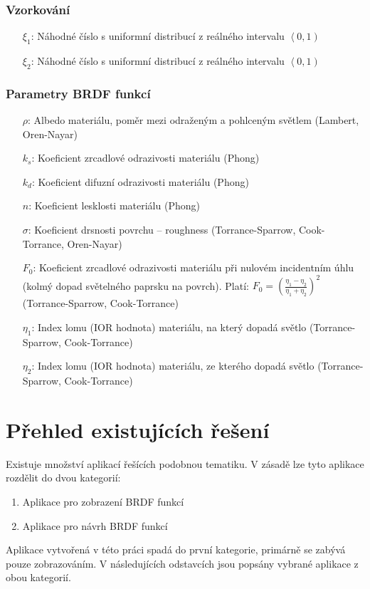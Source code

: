 \documentclass[czech,master]{diploma}
\newcommand{\intervalco}[2]{\left<{{#1},{#2}}\right)}
\newcommand{\randU}{\xi_{1}}
\newcommand{\randV}{\xi_{2}}
\newcommand{\alb}{\rho}
\newcommand{\rough}{\sigma}
\newcommand{\Fzero}{F_0}
\begin{document}
\subsection{Vzorkování}

\begin{itemize}
  \item[\(\randU\):] Náhodné číslo s uniformní distribucí z reálného intervalu \(\intervalco{0}{1}\)
  \item[\(\randV\):] Náhodné číslo s uniformní distribucí z reálného intervalu \(\intervalco{0}{1}\)
\end{itemize}

\subsection{Parametry BRDF funkcí}

\begin{itemize}
  \item[\(\alb\):] Albedo materiálu, poměr mezi odraženým a pohlceným světlem (Lambert, Oren-Nayar)
  \item[\(k_s\):] Koeficient zrcadlové odrazivosti materiálu (Phong)
  \item[\(k_d\):] Koeficient difuzní odrazivosti materiálu (Phong)
  \item[\(n\):] Koeficient lesklosti materiálu (Phong)
  \item[\(\rough\):] Koeficient drsnosti povrchu -- roughness (Torrance-Sparrow, Cook-Torrance, Oren-Nayar)
  \item[\(\Fzero\):] Koeficient zrcadlové odrazivosti materiálu při nulovém incidentním úhlu (kolmý dopad světelného paprsku na povrch). Platí: \(\Fzero = {\left(\frac{\eta_1-\eta_2}{\eta_1+\eta_2}\right)}^2\) (Torrance-Sparrow, Cook-Torrance)
  \item[\(\eta_1\):] Index lomu (IOR hodnota) materiálu, na který dopadá světlo (Torrance-Sparrow, Cook-Torrance)
  \item[\(\eta_2\):] Index lomu (IOR hodnota) materiálu, ze kterého dopadá světlo (Torrance-Sparrow, Cook-Torrance)
\end{itemize}

\clearpage
\chapter{Přehled existujících řešení}
Existuje množství aplikací řešících podobnou tematiku. V zásadě lze tyto aplikace rozdělit do dvou kategorií:
\begin{enumerate}
  \item Aplikace pro zobrazení BRDF funkcí
  \item Aplikace pro návrh BRDF funkcí
\end{enumerate}
Aplikace vytvořená v této práci spadá do první kategorie, primárně se zabývá pouze zobrazováním. V následujících odstavcích jsou popsány vybrané aplikace z obou kategorií.
\end{document}
